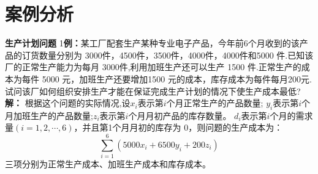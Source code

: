     \section{案例分析}
    \begin{exbox}{\textbf{生产计划问题}}
    1\textbf{例：}某工厂配套生产某种专业电子产品，今年前6个月收到的该产品的订货数量分别为 3000件，4500件，3500件，4000件，4000件和5000 件.已知该厂的正常生产能力为每月 3000件,利用加班生产还可以生产 1500 件.正常生产的成本为每件 5000 元，加班生产还要增加1500 元的成本，库存成本为每件每月200元.试问该厂如何组织安排生产才能在保证完成生产计划的情况下使生产成本最低?
    \textbf{解：} 根据这个问题的实际情况,设$x_i$表示第$i$个月正常生产的产品数量;
    $y_i$表示第$i$个月加班生产的产品数量;$z_i$表示第$i$个月月初产品的库存数量。
    $d_i$表示第$i$个月的需求量$(i=1,2,\cdots,6)$，并且第1个月月初的库存为 0，则问题的生产成本为：
    $$
        \sum_{i=1}^{6}(5000x_i+6500y_i+200z_i)
    $$
    三项分别为正常生产成本、加班生产成本和库存成本。
    \end{exbox}
